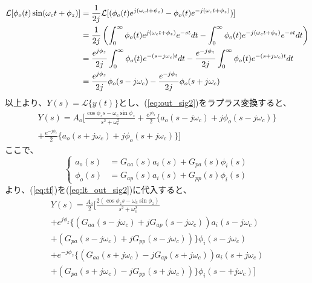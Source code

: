 \documentclass[book]{jlreq}
\begin{document}
%
\begin{align}
    \mathcal{L} [\phi_o(t)\sin(\omega_c t+\phi_z)]
     & = \frac{1}{2j}\mathcal{L}[(\phi_o(t) e^{j(\omega_c t+\phi_z)} - \phi_o(t) e^{-j(\omega_c t+\phi_z)})]\notag \\
     & = \frac{1}{2j}\left(\int_0^\infty \phi_o(t) e^{j(\omega_c t+\phi_z)} e^{-st} dt
    - \int_0^\infty \phi_o(t) e^{-j(\omega_c t+\phi_z)} e^{-st} dt \right)\notag                                   \\
     & = \frac{e^{j\phi_z}}{2j}\int_0^\infty \phi_o(t) e^{-(s-j\omega_c) t} dt
    - \frac{e^{-j\phi_z}}{2j}\int_0^\infty \phi_o(t) e^{-(s+j\omega_c) t} dt\notag                                 \\
     & = \frac{e^{j\phi_z}}{2j}\phi_o(s-j\omega_c) - \frac{e^{-j\phi_z}}{2j} \phi_o(s+j\omega_c)
\end{align}
%
以上より、$Y(s) = \mathcal{L}\{y(t)\}$とし、(\ref{eq:out_sig2})をラプラス変換すると、
%
\begin{multline}
    Y(s) = A_o\biggr [\frac{\cos\phi_z s - \omega_c\sin\phi_z}{s^2+\omega_c^2}
        +  \frac{e^{j\phi_z}}{2}\{a_o(s-j\omega_c) + j \phi_o(s-j\omega_c)\}\\
        + \frac{e^{-j\phi_z}}{2}\{a_o(s+j\omega_c) + j \phi_o(s+j\omega_c)\}\biggl ]
    \label{eq:lt_out_sig2}
\end{multline}
%
ここで、
%
\begin{equation}
    \left\{
    \begin{aligned}
        a_o(s)    & = G_{aa}(s) a_i(s) + G_{pa}(s)\phi_i(s) \\
        \phi_o(s) & = G_{ap}(s) a_i(s) + G_{pp}(s)\phi_i(s)
        \label{eq:tf}
    \end{aligned}
    \right.
\end{equation}
%
より、(\ref{eq:tf})を(\ref{eq:lt_out_sig2})に代入すると、
%
\begin{multline}
    Y(s) = \frac{A_o}{2}\biggr [\frac{2(\cos\phi_z s - \omega_c\sin\phi_z)}{s^2+\omega_c^2}\\
        + e^{j\phi_z}\{(G_{aa}(s-j\omega_c) +j G_{ap}(s-j\omega_c)) a_i(s-j\omega_c)\\
        + (G_{pa}(s-j\omega_c) +j G_{pp}(s-j\omega_c))\} \phi_i(s-j\omega_c)\\
        + e^{-j\phi_z}\{(G_{aa}(s+j\omega_c) -j G_{ap}(s+j\omega_c)) a_i(s+j\omega_c)\\
        + (G_{pa}(s+j\omega_c) -j G_{pp}(s+j\omega_c))\} \phi_i(s-+j\omega_c) \biggl ]
    \label{eq:lt_out_sig3}
\end{multline}
\end{document}

